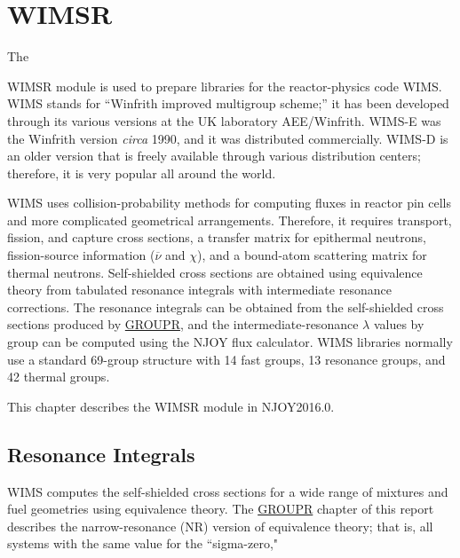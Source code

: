 \section{WIMSR}
\label{sWIMSR}

\hypertarget{sWIMSRhy}{The}
WIMSR module is used to prepare libraries for the
reactor-physics code WIMS\cite{WIMS}.  WIMS stands for
``Winfrith improved multigroup scheme;''
it  has been developed through its various versions
at the UK laboratory AEE/Winfrith.  WIMS-E was the Winfrith
version {\it circa} 1990, and it was distributed commercially.
WIMS-D is an older version that is freely available through various
distribution centers; therefore, it is very popular all around the world.

WIMS uses collision-probability methods
for computing fluxes in reactor pin cells and more complicated
geometrical arrangements.  Therefore, it requires transport,
fission, and capture cross sections, a transfer matrix for epithermal
neutrons, fission-source information ($\overline{\nu}$ and $\chi$),
and a bound-atom scattering matrix for thermal neutrons.  Self-shielded
cross sections are obtained using equivalence theory
from tabulated resonance integrals
with intermediate resonance corrections.
The resonance integrals can be obtained from the
self-shielded cross sections produced by
\hyperlink{sGROUPRhy}{GROUPR}, and the
intermediate-resonance $\lambda$ values by group can
be computed using the NJOY flux calculator.
WIMS libraries normally use a standard 69-group structure with
14 fast groups, 13 resonance groups, and 42 thermal groups.

This chapter describes the WIMSR module in NJOY2016.0.

\subsection{Resonance Integrals}
\label{ssWIMSR_RI}

WIMS computes the self-shielded cross sections
for a wide range of mixtures and fuel geometries using equivalence theory.
The \hyperlink{sGROUPRhy}{GROUPR} chapter of this
report describes the narrow-resonance
(NR) version of equivalence theory; that is, all systems with
the same value for the ``sigma-zero,"

